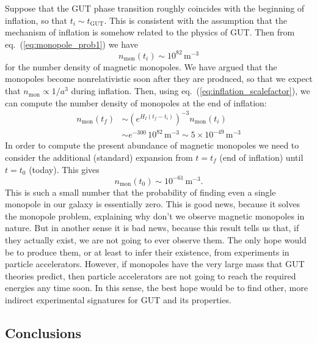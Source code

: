 \documentclass[11pt, a4paper,oneside,openright]{book}
\numberwithin{equation}{section}
\begin{document}
Suppose that the GUT phase transition roughly coincides with the beginning of inflation, so that $t_i\sim t_{\mathrm{GUT}}$. This is consistent with the assumption that the mechanism of inflation is somehow related to the physics of GUT. Then from eq.\ (\ref{eq:monopole_prob1}) we have
\begin{equation}
n_{\mathrm{mon}}(t_i)\sim 10^{82}\,{\mathrm{m^{-3}}}
\end{equation}
for the number density of magnetic monopoles. We have argued that the monopoles become nonrelativistic soon after they are produced, so that we expect that $n_{\mathrm{mon}}\propto 1/a^3$ during inflation. Then, using eq.\ (\ref{eq:inflation_scalefactor}), we can compute the number density of monopoles at the end of inflation:
\begin{equation}
\begin{split}
n_{\mathrm{mon}}(t_f)&\sim \left(e^{H_I(t_f-t_i)}\right)^{-3}n_{\mathrm{mon}}(t_i)\\
&\sim e^{-300}\,10^{82}\,{\mathrm{m^{-3}}}\sim 5\times 10^{-49}\,{\mathrm{m^{-3}}}
\end{split}
\end{equation}
In order to compute the present abundance of magnetic monopoles we need to consider the additional (standard) expansion from $t=t_f$ (end of inflation) until $t=t_0$ (today). This gives
\begin{equation}
n_{\mathrm{mon}}(t_0)\sim 10^{-61}\,{\mathrm{m^{-3}}}.
\end{equation}
This is such a small number that the probability of finding even a single monopole in our galaxy is essentially zero. This is good news, because it solves the monopole problem, explaining why don't we observe magnetic monopoles in nature. But in another sense it is bad news, because this result tells us that, if they actually exist, we are not going to ever observe them. The only hope would be to produce them, or at least to infer their existence, from experiments in particle accelerators. However, if monopoles have the very large mass that GUT theories predict, then particle accelerators are not going to reach the required energies any time soon. In this sense, the best hope would be to find other, more indirect experimental signatures for GUT and its properties.

\subsection{Conclusions}
\end{document}
